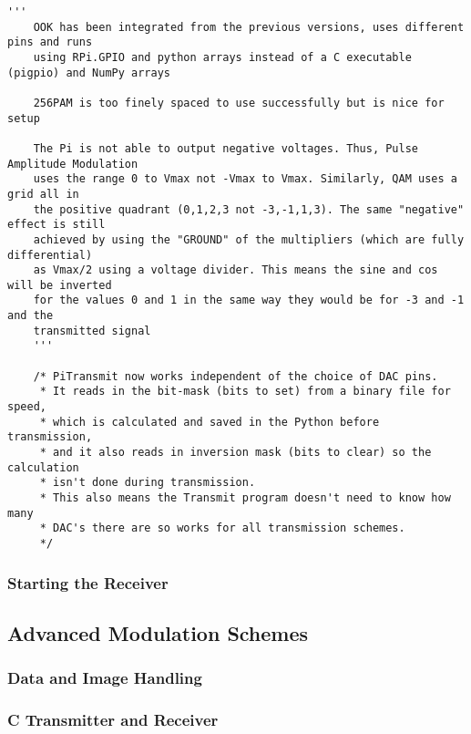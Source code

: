\documentclass[../main.tex]{subfiles}
\begin{document}
\begin{lstlisting}[caption=Transmitter Comment]
	'''
	OOK has been integrated from the previous versions, uses different pins and runs
	using RPi.GPIO and python arrays instead of a C executable (pigpio) and NumPy arrays
	
	256PAM is too finely spaced to use successfully but is nice for setup
	
	The Pi is not able to output negative voltages. Thus, Pulse Amplitude Modulation
	uses the range 0 to Vmax not -Vmax to Vmax. Similarly, QAM uses a grid all in
	the positive quadrant (0,1,2,3 not -3,-1,1,3). The same "negative" effect is still
	achieved by using the "GROUND" of the multipliers (which are fully differential)
	as Vmax/2 using a voltage divider. This means the sine and cos will be inverted
	for the values 0 and 1 in the same way they would be for -3 and -1 and the
	transmitted signal
	'''

	/* PiTransmit now works independent of the choice of DAC pins.
	 * It reads in the bit-mask (bits to set) from a binary file for speed,
	 * which is calculated and saved in the Python before transmission,
	 * and it also reads in inversion mask (bits to clear) so the calculation
	 * isn't done during transmission.
	 * This also means the Transmit program doesn't need to know how many
	 * DAC's there are so works for all transmission schemes.
	 */
\end{lstlisting}

\subsubsection{Starting the Receiver}

\subsection{Advanced Modulation Schemes} \label{sec_Advanced Modulation Schemes}

\subsubsection{Data and Image Handling}
\subsubsection{C Transmitter and Receiver}
\end{document}
